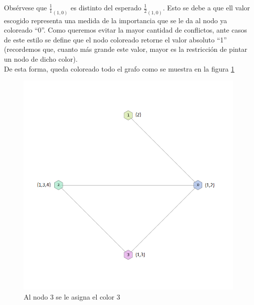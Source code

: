 Obsérvese que $\frac{1}{1}_{(1,0)}$ es distinto del esperado $\frac{1}{2}_{(1,0)}$. Esto se debe a que ell valor escogido representa una medida de la importancia que se le da al nodo ya coloreado ``0''. Como queremos evitar la mayor cantidad de conflictos, ante casos de este estilo se define que el nodo coloreado retorne el valor absoluto ``1'' (recordemos que, cuanto más grande este valor, mayor es la restricción de pintar un nodo de dicho color).\\

De esta forma, queda coloreado todo el grafo como se muestra en la figura \ref{4colores}

 \begin{figure}[H]
    \begin{center}
  	\includegraphics[width=13cm]{imagenes/Ej3/4Nodos4.png}
 	\caption{Al nodo 3 se le asigna el color 3}
 	\label{4colores}
    \end{center}
  \end{figure}




